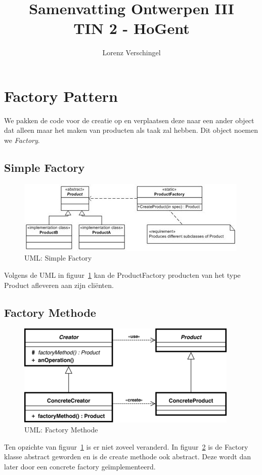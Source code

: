 \documentclass[a4paper,12pt]{article}
\title{Samenvatting Ontwerpen III \\ \large TIN 2 - HoGent}
\author{Lorenz Verschingel}
\begin{document}
\maketitle
\section{Factory Pattern}
We pakken de code voor de creatie op en verplaatsen deze naar een ander object dat alleen maar het maken van producten als taak zal hebben.
Dit object noemen we \textit{Factory}.

\subsection{Simple Factory}
\begin{figure}[H]
\centering
  	\includegraphics[width=.5\linewidth]{img/Factory/SimpleFactory.jpg}
  	\caption{UML: Simple Factory}
  	\label{fig:SimpleFactory}
\end{figure}

Volgens de UML in figuur~\ref{fig:SimpleFactory} kan de ProductFactory producten van het type Product afleveren aan zijn cliënten.

\subsection{Factory Methode}
\begin{figure}[H]
\centering
  	\includegraphics[width=.5\linewidth]{img/Factory/FactoryMethod.png}
  	\caption{UML: Factory Methode}
  	\label{fig:FactoryMethod}
\end{figure}

Ten opzichte van figuur~\ref{fig:SimpleFactory} is er niet zoveel veranderd.
In figuur~\ref{fig:FactoryMethod} is de Factory klasse abstract geworden en is de create methode ook abstract.
Deze wordt dan later door een concrete factory geïmplementeerd.
\end{document}
